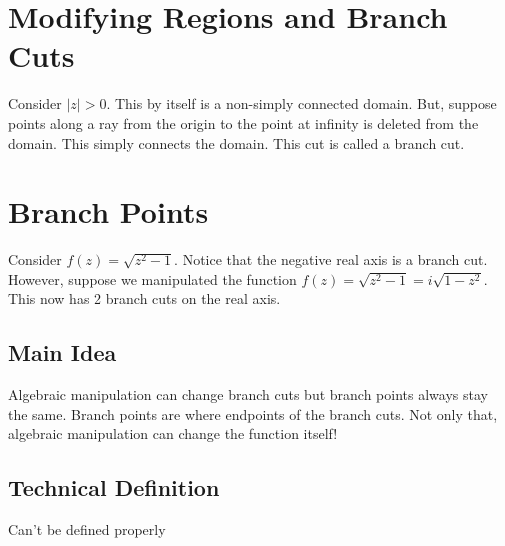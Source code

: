 \documentclass[../main.tex]{subfiles}
\begin{document}
\section{Modifying Regions and Branch Cuts}
    Consider $|z|>0$. This by itself is a non-simply connected domain. But, suppose points along a ray from the origin to the point at infinity is deleted from the domain.
    This simply connects the domain. This cut is called a branch cut.

\section{Branch Points}
    Consider $f(z)=\sqrt{z^{2}-1}$. Notice that the negative real axis is a branch cut. 
    However, suppose we manipulated the function $f(z)=\sqrt{z^{2}-1}=i\sqrt{1-z^{2}}$. This now has 2 branch cuts on the real axis.
    \subsection{Main Idea}
        Algebraic manipulation can change branch cuts but branch points always stay the same. Branch points are where endpoints of the branch cuts.
        Not only that, algebraic manipulation can change the function itself!

    \subsection{Technical Definition}
        Can't be defined properly 
\end{document}

